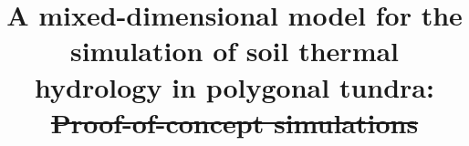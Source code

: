 \documentclass[review]{elsarticle}
\begin{document}
\begin{frontmatter}

\title{A mixed-dimensional model for the simulation of soil thermal hydrology in polygonal tundra: \sout{Proof-of-concept simulations}}






\end{frontmatter}
\end{document}
